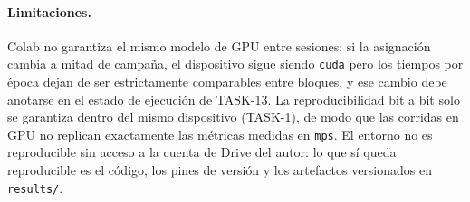\paragraph{Limitaciones.}
Colab no garantiza el mismo modelo de GPU entre sesiones; si la asignación cambia a mitad de
campaña, el dispositivo sigue siendo \texttt{cuda} pero los tiempos por época dejan de ser
estrictamente comparables entre bloques, y ese cambio debe anotarse en el estado de ejecución de
TASK-13. La reproducibilidad bit a bit solo se garantiza dentro del mismo dispositivo (TASK-1),
de modo que las corridas en GPU no replican exactamente las métricas medidas en \texttt{mps}.
El entorno no es reproducible sin acceso a la cuenta de Drive del autor: lo que sí queda
reproducible es el código, los pines de versión y los artefactos versionados en \texttt{results/}.
